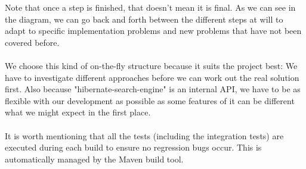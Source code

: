 \noindent
Note that once a step is finished, that doesn't mean it is final. As we can see in the diagram, we can go back and forth between the different steps at will to adapt to specific implementation problems and new problems that have not been covered before.
\\\\
We choose this kind of on-the-fly structure because it suits the project best: We have to investigate different approaches before we can work out the real solution first. Also because "hibernate-search-engine" is an internal API, we have to be as flexible with our development as possible as some features of it can be different what we might expect in the first place.
\\\\
It is worth mentioning that all the tests (including the integration tests) are executed during each build to ensure no regression bugs occur. This is automatically managed by the Maven build tool.
\pagebreak
